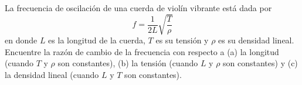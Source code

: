 \item La frecuencia de oscilación de una cuerda de violín vibrante está dada por
$$f = \frac{1}{2L} \sqrt{\frac{T}{\rho}}$$
en donde $L$ es la longitud de la cuerda, $T$ es su tensión y $\rho$ es su densidad lineal. Encuentre la razón de cambio de la frecuencia con respecto a (a) la longitud (cuando $T$ y $\rho$ son constantes), (b) la tensión (cuando $L$ y $\rho$ son constantes) y (c) la densidad lineal (cuando $L$ y $T$ son constantes).
